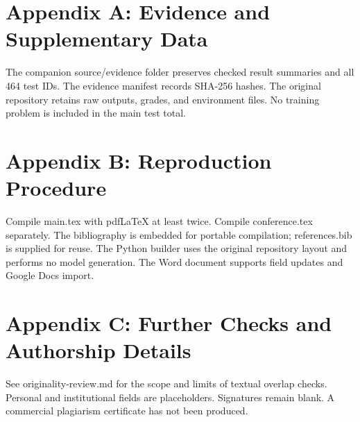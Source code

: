 \documentclass[11pt,letterpaper]{article}
\begin{document}
\clearpage\section*{Appendix A: Evidence and Supplementary Data}

The companion source/evidence folder preserves checked result summaries and all 464 test IDs. The evidence manifest records SHA-256 hashes. The original repository retains raw outputs, grades, and environment files. No training problem is included in the main test total.

\section*{Appendix B: Reproduction Procedure}

Compile main.tex with pdfLaTeX at least twice. Compile conference.tex separately. The bibliography is embedded for portable compilation; references.bib is supplied for reuse. The Python builder uses the original repository layout and performs no model generation. The Word document supports field updates and Google Docs import.

\section*{Appendix C: Further Checks and Authorship Details}

See originality-review.md for the scope and limits of textual overlap checks. Personal and institutional fields are placeholders. Signatures remain blank. A commercial plagiarism certificate has not been produced.
\end{document}
